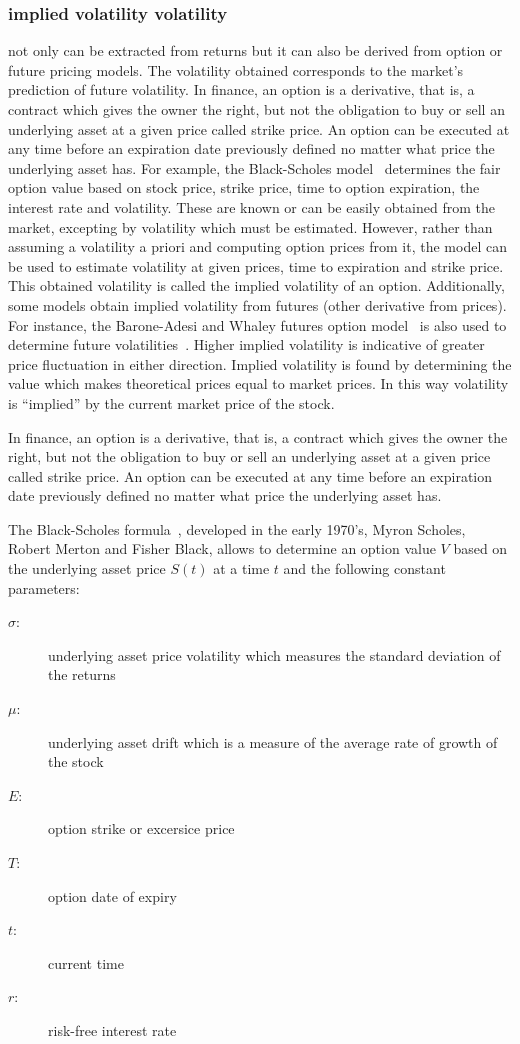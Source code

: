 \subsubsection{implied volatility volatility} not only can be extracted from returns
but it can also be derived from option or future pricing models.  The
volatility obtained corresponds to the market's prediction of future
volatility. In finance, an option is a derivative, that is, a contract which
gives the owner the right, but not the obligation to buy or sell an underlying
asset at a given price called strike price. An option can be executed at any
time before an expiration date previously defined no matter what price the
underlying asset has. For example, the Black-Scholes model~\cite{black1973}
determines the fair option value based on stock price, strike price, time to
option expiration, the interest rate and volatility. These are known or can be
easily obtained from the market, excepting by volatility which must be
estimated. However, rather than assuming a volatility a priori and computing
option prices from it, the model can be used to estimate volatility at given
prices, time to expiration and strike price. This obtained volatility is called
the implied volatility of an option. Additionally, some models obtain implied
volatility from futures (other derivative from prices). For instance, the
Barone-Adesi and Whaley futures option model~\cite{baroneetal1987} is also used
to determine future volatilities~\cite{hamidetal2004}. Higher implied
volatility is indicative of greater price fluctuation in either direction.
Implied volatility is found by determining the value which makes theoretical
prices equal to market prices. In this way volatility is ``implied'' by the
current market price of the stock.

In finance, an option is a derivative, that is, a contract which gives the owner
the right, but not the obligation to buy or sell an underlying asset at a given
price called strike price. An option can be executed at any time before an
expiration date previously defined no matter what price the underlying asset
has. 

The Black-Scholes formula~\cite{black1973}, developed in the early 1970's, Myron
Scholes, Robert Merton and Fisher Black,  allows to determine an option value
$V$ based on the underlying asset price $S(t)$ at a time $t$ and the following
constant parameters: 

\begin{description}
\item [$\sigma$:] underlying asset price volatility which measures the standard
deviation of the returns
\item [$\mu$:] underlying asset drift which is a measure of the average rate of
growth of the stock
\item[$E$:] option strike or excersice price
\item[$T$:] option date of expiry
\item[$t$:] current time
\item[$r$:] risk-free interest rate
\end{description}

